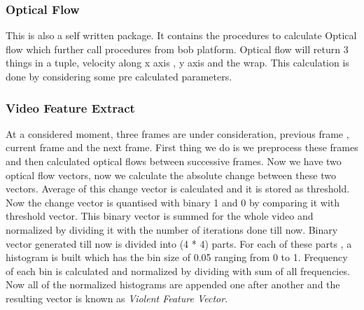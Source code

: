 \subsubsection{Optical Flow}
This is also a self written package. It contains the procedures to calculate Optical flow which further call procedures from bob platform. Optical flow will return 3 things in a tuple, velocity along x axis , y axis and the wrap. This calculation is done by considering some pre calculated parameters.
\subsubsection{Video Feature Extract}
At a considered moment, three frames are under consideration, previous frame , current frame and the next frame. First thing we do is we preprocess these frames and then calculated optical flows between successive frames. Now we have two optical flow vectors, now we calculate the absolute change between these two vectors. Average of this change vector is calculated and it is stored as threshold. Now the change vector is quantised with binary 1 and 0 by comparing it with threshold vector. This binary vector is summed for the whole video and normalized by dividing it with the number of iterations done till now. Binary vector generated till now is divided into (4 * 4) parts. For each of these parts , a histogram is built which has the bin size of 0.05 ranging from 0 to 1. Frequency of each bin is calculated and normalized by dividing with sum of all frequencies. Now all of the normalized histograms are appended one after another and the resulting vector is known as \textit{Violent Feature Vector}.



